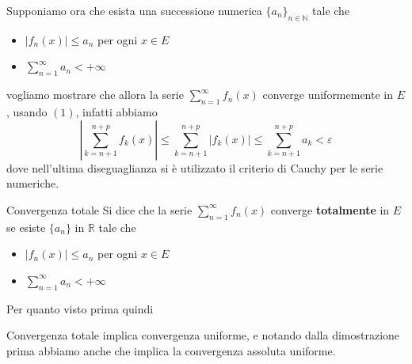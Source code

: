 \begin{example}
Supponiamo ora che esista una successione numerica \({\{a_{n}\}}_{n \in
\mathbb{N}}  \) tale che
\begin{itemize}
    \item \(|f_{n}(x)| \le a_{n}\) per ogni \(x \in E\) 
    \item \(\sum_{n=1}^{\infty} a_{n} < +\infty\)
\end{itemize}
vogliamo mostrare che allora la serie \(\sum_{n=1}^{\infty} f_{n}(x)\) converge
uniformemente in \(E\), usando \((1)\), infatti abbiamo 
\[
    \left| \sum_{k=n+1}^{n+p} f_{k}(x) \right| \le \sum_{k=n+1}^{n+p} |f_{k}(x)|
    \le \sum_{k=n+1}^{n+p} a_{k} < \varepsilon
\]
dove nell'ultima diseguaglianza si è utilizzato il criterio di Cauchy per le
serie numeriche.
\end{example}
\begin{definition}{Convergenza totale}
    Si dice che la serie \(\sum_{n=1}^{\infty} f_{n}(x)\) converge
    \textbf{totalmente} in \(E\) se esiste \(\{a_{n}\} \) in \(\mathbb{R}\) tale
    che 
    \begin{itemize}
        \item \(|f_{n}(x)| \le a_{n}\) per ogni \(x \in E\) 
        \item \(\sum_{n=1}^{\infty} a_{n} < +\infty\)
    \end{itemize}
\end{definition}
Per quanto visto prima quindi
\begin{proposition}
    Convergenza totale implica convergenza uniforme, e notando dalla
    dimostrazione prima abbiamo anche che implica la convergenza assoluta
    uniforme.
\end{proposition}

